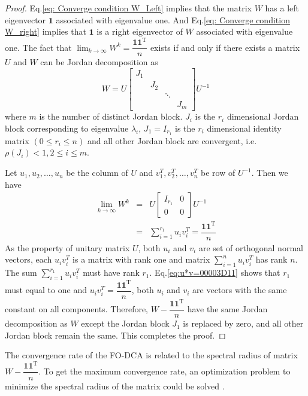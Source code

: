\begin{proof}
Eq.\ref{eq: Converge condition W_Left} implies that the matrix $W$
has a left eigenvector $\mathbf{1}$ associated with eigenvalue one.
And Eq.\ref{eq: Converge condition W_right} implies that $\mathbf{1}$
is a right eigenvector of $W$ associated with eigenvalue one. The
fact that $\lim_{k\rightarrow\infty}W^{k}=\dfrac{\mathbf{11}^{\mathrm{T}}}{n}$
exists if and only if there exists a  matrix $U$ and $W$ can be
Jordan decomposition as 
\begin{equation}
W=U\left[\begin{array}{cccc}
J_{1}\\
 & J_{2}\\
 &  & \ddots\\
 &  &  & J_{m}
\end{array}\right]U^{-1}
\end{equation}
where $m$ is the number of distinct Jordan block. $J_{i}$ is the
$r_{i}$ dimensional Jordan block corresponding to eigenvalue $\lambda_{i}$,
$J_{1}=I_{r_{1}}$ is the $r_{i}$ dimensional identity matrix $\left(0\leq r_{i}\leq n\right)$
and all other Jordan block are convergent, i.e. $\rho\left(J_{i}\right)<1,2\leq i\leq m$.

Let $u_{1},u_{2},\ldots,u_{n}$ be the column of $U$ and $v_{1}^{T},v_{2}^{T},\ldots,v_{n}^{T}$
be row of $U^{-1}$. Then we have 
\begin{eqnarray}
\lim_{k\to\infty}W^{k} & = & U\left[\begin{array}{cc}
I_{r_{1}} & 0\\
0 & 0
\end{array}\right]U^{-1}\label{eq: W^k to infinity has Rank one}\\
 & = & \sum_{i=1}^{r_{1}}u_{i}v_{i}^{T}=\dfrac{\mathbf{11}^{\mathrm{T}}}{n}\label{eq:u*v=00003D11}
\end{eqnarray}
As the property of unitary matrix $U$, both $u_{i}$ and $v_{i}$
are set of orthogonal normal vectors, each $u_{i}v_{i}^{T}$ is a
matrix with rank one and matrix $\sum_{i=1}^{n}u_{i}v_{i}^{T}$ has
rank $n$. The sum $\sum_{i=1}^{r_{1}}u_{i}v_{i}^{T}$ must have rank
$r_{1}.$ Eq.\ref{eq:u*v=00003D11} shows that $r_{1}$ must equal
to one and $u_{i}v_{i}^{T}=\dfrac{\mathbf{11}^{\mathrm{T}}}{n}$,
both $u_{i}$ and $v_{i}$ are vectors with the same constant on all
components. Therefore, $W-\dfrac{\mathbf{11}^{\mathrm{T}}}{n}$ have
the same Jordan decomposition as $W$ except the Jordan block $J_{1}$
is replaced by zero, and all other Jordan block remain the same. This
completes the proof. 
\end{proof}
The convergence rate of the FO-DCA is related to the spectral radius
of matrix $W-\dfrac{\mathbf{11}^{\mathrm{T}}}{n}$. To get the maximum
convergence rate, an optimization problem to minimize the spectral
radius of the matrix could be solved \cite{Xiao2004}. 

